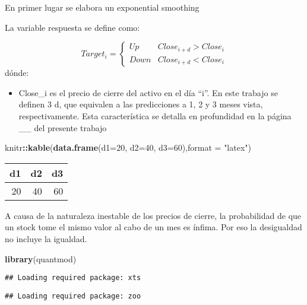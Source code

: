 \documentclass[]{article}
\title{}
\author{}
\date{}
\newenvironment{Shaded}{\begin{snugshade}}{\end{snugshade}}
\newcommand{\KeywordTok}[1]{\textcolor[rgb]{0.13,0.29,0.53}{\textbf{#1}}}
\newcommand{\DataTypeTok}[1]{\textcolor[rgb]{0.13,0.29,0.53}{#1}}
\newcommand{\DecValTok}[1]{\textcolor[rgb]{0.00,0.00,0.81}{#1}}
\newcommand{\StringTok}[1]{\textcolor[rgb]{0.31,0.60,0.02}{#1}}
\newcommand{\OperatorTok}[1]{\textcolor[rgb]{0.81,0.36,0.00}{\textbf{#1}}}
\newcommand{\NormalTok}[1]{#1}
\providecommand{\tightlist}{%
  \setlength{\itemsep}{0pt}\setlength{\parskip}{0pt}}
\begin{document}
En primer lugar se elabora un exponential smoothing

La variable respuesta se define como:

\[ Target_i =\begin{cases}Up & Close_{i+d} > Close_{i} \\Down & Close_{i+d} < Close_{i}\end{cases} \]
dónde:

\begin{itemize}
\tightlist
\item
  Close\_i es el precio de cierre del activo en el día ``i''. En este
  trabajo se definen 3 d, que equivalen a las predicciones a 1, 2 y 3
  meses vista, respectivamente. Esta característica se detalla en
  profundidad en la página \_\_ del presente trabajo
\end{itemize}

\begin{Shaded}
\begin{Highlighting}[]
\NormalTok{knitr}\OperatorTok{::}\KeywordTok{kable}\NormalTok{(}\KeywordTok{data.frame}\NormalTok{(}\DataTypeTok{d1=}\DecValTok{20}\NormalTok{,}
                        \DataTypeTok{d2=}\DecValTok{40}\NormalTok{,}
                        \DataTypeTok{d3=}\DecValTok{60}\NormalTok{),}\DataTypeTok{format =} \StringTok{"latex"}\NormalTok{)}
\end{Highlighting}
\end{Shaded}

\begin{tabular}{r|r|r}
\hline
d1 & d2 & d3\\
\hline
20 & 40 & 60\\
\hline
\end{tabular}

\justifying
A causa de la naturaleza inestable de los precios de cierre, la
probabilidad de que un stock tome el mismo valor al cabo de un mes es
ínfima. Por eso la desigualdad no incluye la igualdad.

\begin{Shaded}
\begin{Highlighting}[]
\KeywordTok{library}\NormalTok{(quantmod)}
\end{Highlighting}
\end{Shaded}

\begin{verbatim}
## Loading required package: xts
\end{verbatim}

\begin{verbatim}
## Loading required package: zoo
\end{verbatim}
\end{document}
